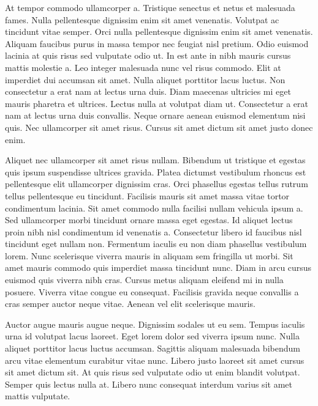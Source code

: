 \documentclass[12pt]{article}
\begin{document}
At tempor commodo ullamcorper a. Tristique senectus et netus et malesuada fames. Nulla pellentesque dignissim enim sit amet venenatis. Volutpat ac tincidunt vitae semper. Orci nulla pellentesque dignissim enim sit amet venenatis. Aliquam faucibus purus in massa tempor nec feugiat nisl pretium. Odio euismod lacinia at quis risus sed vulputate odio ut. In est ante in nibh mauris cursus mattis molestie a. Leo integer malesuada nunc vel risus commodo. Elit at imperdiet dui accumsan sit amet. Nulla aliquet porttitor lacus luctus. Non consectetur a erat nam at lectus urna duis. Diam maecenas ultricies mi eget mauris pharetra et ultrices. Lectus nulla at volutpat diam ut. Consectetur a erat nam at lectus urna duis convallis. Neque ornare aenean euismod elementum nisi quis. Nec ullamcorper sit amet risus. Cursus sit amet dictum sit amet justo donec enim.

Aliquet nec ullamcorper sit amet risus nullam. Bibendum ut tristique et egestas quis ipsum suspendisse ultrices gravida. Platea dictumst vestibulum rhoncus est pellentesque elit ullamcorper dignissim cras. Orci phasellus egestas tellus rutrum tellus pellentesque eu tincidunt. Facilisis mauris sit amet massa vitae tortor condimentum lacinia. Sit amet commodo nulla facilisi nullam vehicula ipsum a. Sed ullamcorper morbi tincidunt ornare massa eget egestas. Id aliquet lectus proin nibh nisl condimentum id venenatis a. Consectetur libero id faucibus nisl tincidunt eget nullam non. Fermentum iaculis eu non diam phasellus vestibulum lorem. Nunc scelerisque viverra mauris in aliquam sem fringilla ut morbi. Sit amet mauris commodo quis imperdiet massa tincidunt nunc. Diam in arcu cursus euismod quis viverra nibh cras. Cursus metus aliquam eleifend mi in nulla posuere. Viverra vitae congue eu consequat. Facilisis gravida neque convallis a cras semper auctor neque vitae. Aenean vel elit scelerisque mauris.

Auctor augue mauris augue neque. Dignissim sodales ut eu sem. Tempus iaculis urna id volutpat lacus laoreet. Eget lorem dolor sed viverra ipsum nunc. Nulla aliquet porttitor lacus luctus accumsan. Sagittis aliquam malesuada bibendum arcu vitae elementum curabitur vitae nunc. Libero justo laoreet sit amet cursus sit amet dictum sit. At quis risus sed vulputate odio ut enim blandit volutpat. Semper quis lectus nulla at. Libero nunc consequat interdum varius sit amet mattis vulputate.
\end{document}
